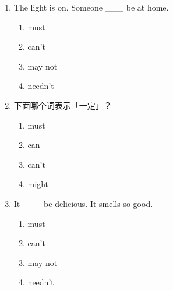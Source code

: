 \documentclass[11pt,a4paper]{ctexart}
\begin{document}
\begin{enumerate}[leftmargin=*,itemsep=4pt]
\begin{enumerate}[label=\Alph*.,leftmargin=2em,itemsep=1pt,topsep=2pt]
\item might not
\end{enumerate}
\item The light is on. Someone \_\_\_ be at home.
\begin{enumerate}[label=\Alph*.,leftmargin=2em,itemsep=1pt,topsep=2pt]
\item must
\item can’t
\item may not
\item needn’t
\end{enumerate}
\item 下面哪个词表示「一定」？
\begin{enumerate}[label=\Alph*.,leftmargin=2em,itemsep=1pt,topsep=2pt]
\item must
\item can
\item can’t
\item might
\end{enumerate}
\item It \_\_\_ be delicious. It smells so good.
\begin{enumerate}[label=\Alph*.,leftmargin=2em,itemsep=1pt,topsep=2pt]
\item must
\item can’t
\item may not
\item needn’t
\end{enumerate}
\end{enumerate}
\end{document}
